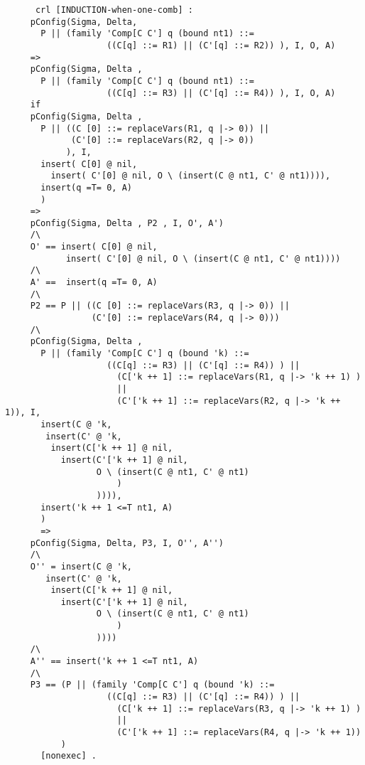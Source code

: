 \begin{lstlisting}
      crl [INDUCTION-when-one-comb] :
     pConfig(Sigma, Delta, 
       P || (family 'Comp[C C'] q (bound nt1) ::= 
                    ((C[q] ::= R1) || (C'[q] ::= R2)) ), I, O, A)
     =>
     pConfig(Sigma, Delta , 
       P || (family 'Comp[C C'] q (bound nt1) ::= 
                    ((C[q] ::= R3) || (C'[q] ::= R4)) ), I, O, A)
     if 
     pConfig(Sigma, Delta , 
       P || ((C [0] ::= replaceVars(R1, q |-> 0)) || 
             (C'[0] ::= replaceVars(R2, q |-> 0))
            ), I, 
       insert( C[0] @ nil, 
         insert( C'[0] @ nil, O \ (insert(C @ nt1, C' @ nt1)))), 
       insert(q =T= 0, A)
       ) 
     => 
     pConfig(Sigma, Delta , P2 , I, O', A')
     /\
     O' == insert( C[0] @ nil, 
            insert( C'[0] @ nil, O \ (insert(C @ nt1, C' @ nt1))))
     /\
     A' ==  insert(q =T= 0, A) 
     /\
     P2 == P || ((C [0] ::= replaceVars(R3, q |-> 0)) || 
                 (C'[0] ::= replaceVars(R4, q |-> 0)))
     /\
     pConfig(Sigma, Delta , 
       P || (family 'Comp[C C'] q (bound 'k) ::= 
                    ((C[q] ::= R3) || (C'[q] ::= R4)) ) || 
                      (C['k ++ 1] ::= replaceVars(R1, q |-> 'k ++ 1) ) 
                      ||
                      (C'['k ++ 1] ::= replaceVars(R2, q |-> 'k ++ 1)), I, 
       insert(C @ 'k, 
        insert(C' @ 'k,
         insert(C['k ++ 1] @ nil,
           insert(C'['k ++ 1] @ nil,
                  O \ (insert(C @ nt1, C' @ nt1)
                      )
                  )))),
       insert('k ++ 1 <=T nt1, A)
       )
       =>
     pConfig(Sigma, Delta, P3, I, O'', A'')
     /\
     O'' = insert(C @ 'k, 
        insert(C' @ 'k,
         insert(C['k ++ 1] @ nil,
           insert(C'['k ++ 1] @ nil,
                  O \ (insert(C @ nt1, C' @ nt1)
                      )
                  ))))
     /\
     A'' == insert('k ++ 1 <=T nt1, A) 
     /\
     P3 == (P || (family 'Comp[C C'] q (bound 'k) ::= 
                    ((C[q] ::= R3) || (C'[q] ::= R4)) ) || 
                      (C['k ++ 1] ::= replaceVars(R3, q |-> 'k ++ 1) ) 
                      ||
                      (C'['k ++ 1] ::= replaceVars(R4, q |-> 'k ++ 1))
           )
       [nonexec] .   
       

\end{lstlisting}
